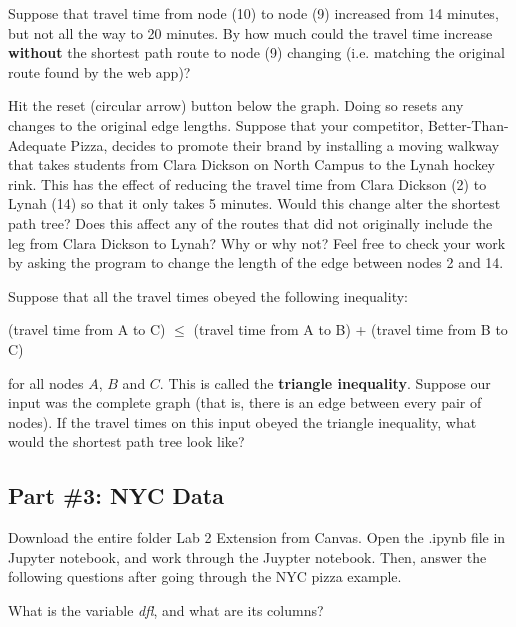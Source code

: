 \documentclass[twoside]{article}%
\begin{document}
\vskip 1.5in

\noindent
Suppose that travel time from node (10) to node (9) increased from 14 minutes, but not all the way to 20 minutes.  By how much could the travel time increase {\bf without} the shortest path route to node (9) changing (i.e. matching the original route found by the web app)?


\vskip 1.5in

\noindent
Hit the reset (circular arrow) button below the graph.  Doing so resets any changes to the original edge lengths.  Suppose that your competitor, Better-Than-Adequate Pizza, decides to promote their brand by installing a moving walkway that takes students from Clara Dickson on North Campus to the Lynah hockey rink.  This has the effect of reducing the travel time from Clara Dickson (2) to Lynah (14) so that it only takes 5 minutes.  Would this change alter the shortest path tree? Does this
affect any of the routes that did not originally include the
leg from Clara Dickson to Lynah? Why or why not?  Feel free to check your work by asking the program to change the length of the edge between nodes 2 and 14.

\vskip 1.5in

\noindent
Suppose that all the travel times obeyed the following inequality:
\begin{center}
(travel time from A to C) $\le$ (travel time from A to B) + (travel
time from B to C)
\end{center}
for all nodes $A$, $B$ and $C$.  This is called the {\bf triangle
inequality}. Suppose our input was the complete graph (that is, there is an edge between every pair of nodes).  If the travel times on this input obeyed the triangle inequality, what would the shortest path tree look like?

\vskip 1.5in

\noindent
\subsection*{Part \#3: NYC Data}


\smallskip

\noindent
Download the entire folder Lab 2 Extension from Canvas. Open the .ipynb file in Jupyter notebook, and work through the Juypter notebook.  Then, answer the following questions after going through the NYC pizza example.

\smallskip

\noindent
What is the variable \textit{dfl}, and what are its columns?
\end{document}
